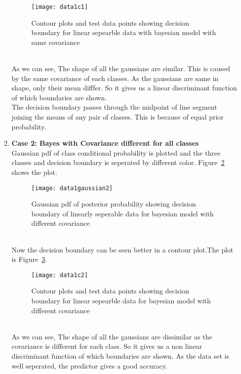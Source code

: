 \documentclass[11pt,paper=a4,answers]{exam}
\begin{document}
\begin{questions}
\begin{enumerate}[i.]
\begin{enumerate}
            \begin{figure}[ht]
                \centering
                \texttt{[image: data1c1]}
                \vspace{-30pt}
                \caption{Contour plots and test data points showing decision boundary for linear sepearble data with bayesian model with same covariance}
                \label{fig:data1c1}
            \end{figure}\\
            As we can see, The shape of all the gaussians are similar. This is caused by the same covariance of each classes. As the gaussians are same in shape, only their mean difffer. So it gives us a linear discriminant function of which boundaries are shown.\\
            The decision boundary passes through the midpoint of line segment joining the means of any pair of classes. This is because of equal prior probability.
            
            \item \textbf{Case 2: Bayes with Covariance different for all classes}\\
            Gaussian pdf of class conditional probability is plotted and the three classes and decision boundary is seperated by different color. Figure~\ref{fig:data1g2} shows the plot.
            \begin{figure}[ht]
                \centering
                \texttt{[image: data1gaussian2]}
                \vspace{-30pt}
                \caption{Gaussian pdf of posterior probability showing decision boundary of linearly seperable data for bayesian model with different covariance}
                \label{fig:data1g2}
            \end{figure}\\
            Now the decision boundary can be seen better in a contour plot.The plot is Figure~\ref{fig:data1c2}.
            \begin{figure}[ht]
                \centering
                \texttt{[image: data1c2]}
                \vspace{-30pt}
                \caption{Contour plots and test data points showing decision boundary for linear sepearble data for bayesian model with different covariance}
                \label{fig:data1c2}
            \end{figure}\\
            As we can see, The shape of all the gaussians are dissimilar as the covariance is different for each class. So it gives us a non linear discriminant function of which boundaries are shown. As the data set is well seperated, the predictor gives a good accuracy.


\end{enumerate}
\end{enumerate}
\end{questions}
\end{document}
